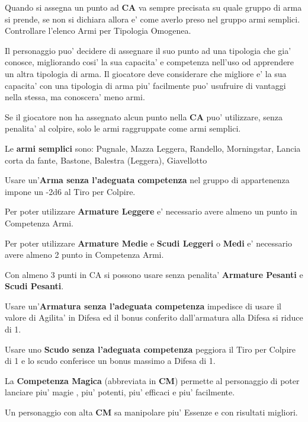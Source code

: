 \documentclass[a4paper,11pt,twoside,openany]{book}
\begin{document}
Quando si assegna un punto ad \textbf{CA} va sempre precisata su quale gruppo di arma si prende, se non si dichiara allora e' come averlo preso nel gruppo armi semplici.
Controllare l'elenco Armi per Tipologia Omogenea.

Il personaggio puo' decidere di assegnare il suo punto ad una tipologia che gia' conosce, migliorando cosi' la sua capacita' e competenza nell'uso od apprendere un altra tipologia di arma. 
Il giocatore deve considerare che migliore e' la sua capacita' con una tipologia di arma piu' facilmente puo' usufruire di vantaggi nella stessa, ma conoscera' meno armi.

Se il giocatore non ha assegnato alcun punto nella \textbf{CA} puo' utilizzare, senza penalita' al colpire, solo le armi raggruppate come armi semplici.

Le \textbf{armi semplici} sono: Pugnale, Mazza Leggera, Randello, Morningstar,
Lancia corta da fante, Bastone, Balestra (Leggera), Giavellotto

Usare un'\textbf{Arma senza l'adeguata competenza} nel gruppo di appartenenza impone un -2d6 al Tiro per Colpire.

Per poter utilizzare \textbf{Armature Leggere} e' necessario avere almeno un punto in Competenza Armi.

Per poter utilizzare \textbf{Armature Medie} e \textbf{Scudi Leggeri} o \textbf{Medi} e' necessario avere almeno 2 punto in Competenza Armi.

Con almeno 3 punti in CA si possono usare senza penalita' \textbf{Armature Pesanti} e \textbf{Scudi Pesanti}.

Usare un'\textbf{Armatura senza l'adeguata competenza} impedisce di usare il valore di Agilita' in Difesa ed il bonus conferito dall'armatura alla Difesa si riduce di 1.

Usare uno \textbf{Scudo senza l'adeguata competenza} peggiora il Tiro per Colpire di 1 e lo scudo conferisce un bonus massimo a Difesa di 1.

La \textbf{Competenza Magica} (abbreviata in \textbf{CM}) permette al personaggio di poter lanciare piu' magie , piu' potenti, piu' efficaci e piu' facilmente.

Un personaggio con alta \textbf{CM} sa manipolare piu' Essenze e con risultati migliori.
\end{document}
